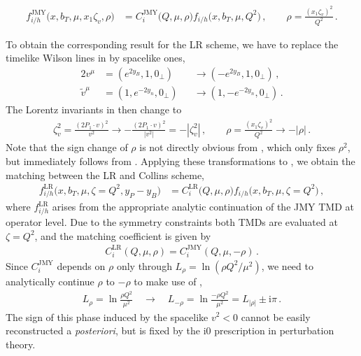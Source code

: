 \documentclass[11pt,a4paper]{article}
\newcommand{\img}{\mathrm{i}}
\newcommand{\nn}{\nonumber}
\newcommand{\tv}{{\tilde v}}
\newcommand{\JMY}{\mathrm{JMY}}
\newcommand{\LR}{\mathrm{LR}}
\begin{document}
\begin{align} \label{eq:tmd_scheme_relations_3}
 f^\JMY_{i/h}\bigl(x, b_T, \mu, x_1 \zeta_v, \rho\bigr) &
 = C_i^\JMY\bigl(Q, \mu, \rho\bigr)
   f_{i/h}\bigl(x, b_T, \mu, Q^2 \bigr)
\,,\qquad
 \rho = \frac{(x_1 \zeta_v)^2}{Q^2}
\,.\end{align}

To obtain the corresponding result for the LR scheme,
we have to replace the timelike Wilson lines in  by spacelike ones,
\begin{alignat}{2}
 v^\mu &= (e^{2 y_B}, 1, 0_\perp) &&\to (-e^{2 y_B}, 1, 0_\perp)
\,,\nn\\
 \tv^\mu &= (1, e^{-2 y_n}, 0_\perp) &&\to (1, -e^{-2 y_n}, 0_\perp)
\,.\end{alignat}
The Lorentz invariants in  then change to
\begin{align}
 \zeta_v^2 = \frac{(2 P_1 \cdot v)^2}{v^2} \to - \frac{(2 P_1 \cdot v)^2}{|v^2|} = -|\zeta_v^2|
\,,\qquad
 \rho = \frac{(x_1 \zeta_v)^2}{Q^2} \to -|\rho|
\,.\end{align}
Note that the sign change of $\rho$ is not directly obvious from ,
which only fixes $\rho^2$, but immediately follows from .
Applying these transformations to ,
we obtain the matching between the LR and Collins scheme,
\begin{align} \label{eq:tmd_scheme_relations_4}
 f^\LR_{i/h}\bigl(x, b_T, \mu, \zeta = Q^2, y_P - y_B \bigr) &
 = C_i^\LR\bigl(Q, \mu, \rho\bigr)
   f_{i/h}\bigl(x, b_T, \mu, \zeta = Q^2 \bigr)
\,,\end{align}
where $f^\LR_{i/h}$ arises from the appropriate analytic continuation
of the JMY TMD at operator level. Due to the symmetry constraints
both TMDs are evaluated at $\zeta = Q^2$, and the matching coefficient is given by
\begin{align} \label{eq:C_LR_JMY}
 C_i^\LR(Q, \mu, \rho)
 = C_i^\JMY(Q, \mu, -\rho )
\,.\end{align}
Since $C_i^\JMY$ depends on $\rho$ only through $L_\rho = \ln(\rho Q^2 / \mu^2)$,
we need to analytically continue $\rho$ to $-\rho$ to make use of ,
\begin{align}
 L_\rho
 = \ln\frac{\rho Q^2}{\mu^2}
 \quad\rightarrow\quad
 L_{-\rho}
 = \ln\frac{-\rho Q^2}{\mu^2}
 = L_{|\rho|} \pm \img\pi
\,.\end{align}
The sign of this phase induced by the spacelike $v^2 < 0$ cannot be easily reconstructed a \textit{posteriori},
but is fixed by the $\img0$ prescription in perturbation theory.
\end{document}
